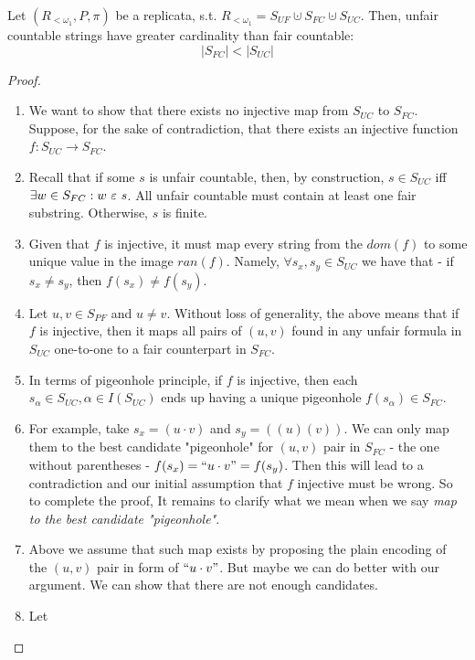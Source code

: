 \begin{lemma}\label{lemma_card_uc}
  Let $(R_{<\omega_1}, P, \pi)$ be a replicata, s.t. $R_{<\omega_1} = S_{UF} \cupdot S_{FC} \cupdot  S_{UC}$.
  Then, unfair countable strings have greater cardinality than fair countable: \[ |S_{FC}| < |S_{UC}| \]
\end{lemma}
\begin{proof}
  \begin{enumerate}[label=(\roman*)]
  \item We want to show that there exists no injective map from  $S_{UC}$ to $S_{FC}$. Suppose, for the sake of contradiction, that there exists an injective function $f: S_{UC} \to S_{FC}$. 
  \item Recall that if some $s$ is unfair countable, then, by construction, $s \in S_{UC}$ iff $\exists w \in S_{FC}: w \ \varepsilon\  s$. All unfair countable must contain at least one fair substring. Otherwise, $s$ is finite.
  \item Given that $f$ is injective, it must map every string from the $dom(f)$ to some unique value in the image $ran(f)$. Namely, $\forall s_x, s_y \in S_{UC}$ we have that - if $s_x \neq s_y$, then $f(s_x) \neq f(s_y)$. 
  \item Let $u,v \in S_{PF}$ and $u \neq v$. Without loss of generality, the above means that if $f$ is injective, then it maps all pairs of $(u,v)$ found in any unfair formula in $S_{UC}$ one-to-one to a fair counterpart in $S_{FC}$. 
  \item In terms of pigeonhole principle, if $f$ is injective, then each $s_\alpha \in S_{UC}, \alpha \in I(S_{UC})$ ends up having a unique pigeonhole $f(s_\alpha) \in S_{FC}$.
  \item For example, take $s_x = (u \cdot v)$ and $s_y = ((u)(v))$. We can only map them to the best candidate "pigeonhole" for $(u,v)$ pair in $S_{FC}$ - the one without parentheses - $f(s_x) = \text{``} u \cdot v \text{''} = f(s_y) $. Then this will lead to a contradiction and our initial assumption that $f$ injective must be wrong. So to complete the proof, It remains to clarify what we mean when we say \textit{map to the best candidate "pigeonhole"}.
  \item Above we assume that such map exists by proposing the plain encoding of the $(u,v)$ pair in form of $\text{``} u \cdot v \text{''}$. But maybe we can do better with our argument. We can show that there are not enough candidates.
  \item Let 
    \begin{equation*}

\end{equation*}
\end{enumerate}
\end{proof}
